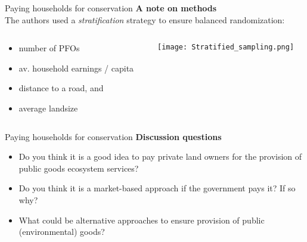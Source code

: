 \documentclass[aspectratio=169]{beamer}
\begin{document}
	\begin{frame}{Paying households for conservation}
		\textbf{A note on methods} \\ \vspace*{.5cm}
		The authors used a \textit{stratification} strategy to ensure balanced randomization: \\ \vspace*{.5cm}
		\begin{columns}
			\begin{column}{0.5\textwidth}
				\begin{itemize}[<+->]
					\item number of PFOs
					\item av. household earnings / capita
					\item distance to a road, and
					\item average landsize
				\end{itemize}
				\vspace*{1cm}
			\end{column}
			\begin{column}{0.5\textwidth}
				\begin{center}
					\texttt{[image: Stratified\_sampling.png]}
				\end{center}
			\end{column}
		\end{columns}
	\end{frame}

	\begin{frame}{Paying households for conservation}
		\textbf{Discussion questions} \\ \vspace*{.25cm}
		\begin{itemize}
			\item Do you think it is a good idea to pay private land owners for the provision of public goods \/ ecosystem services?
			\item Do you think it is a market-based approach if the government pays it? If so why?
			\item What could be alternative approaches to ensure provision of public (environmental) goods?
		\end{itemize}
	\end{frame}

\end{document}
